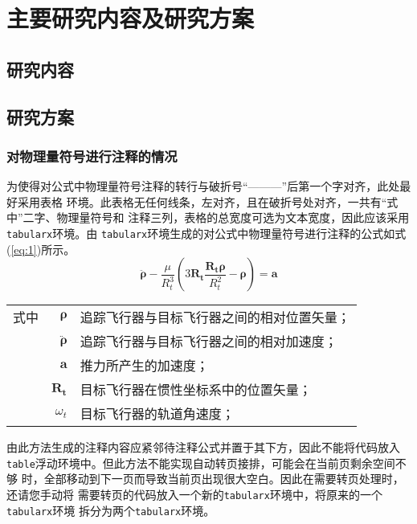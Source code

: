 
\chapter{主要研究内容及研究方案}

\section{研究内容}

\lipsum[1]

\section{研究方案}

\subsection{对物理量符号进行注释的情况}

为使得对公式中物理量符号注释的转行与破折号“———”后第一个字对齐，此处最好采用表格
环境。此表格无任何线条，左对齐，且在破折号处对齐，一共有“式中”二字、物理量符号和
注释三列，表格的总宽度可选为文本宽度，因此应该采用\verb|tabularx|环境。由
\verb|tabularx|环境生成的对公式中物理量符号进行注释的公式如式(\ref{eq:1})所示。
\begin{equation}\label{eq:1}
\ddot{\bm{\rho}}-\frac{\mu}{R_{t}^{3}}\left(3\bm{R_{t}}\frac{\bm{R_{t}\rho}}{R_{t}^{2}}-\bm{\rho}\right)=\bm{a}
\end{equation}
\begin{tabularx}{\textwidth}{@{}l@{\quad}r@{———}X@{}}
式中& $\bm{\rho}$ &追踪飞行器与目标飞行器之间的相对位置矢量；\\
&  $\bm{\ddot{\rho}}$&追踪飞行器与目标飞行器之间的相对加速度；\\
&  $\bm{a}$   &推力所产生的加速度；\\
&  $\bm{R_t}$ & 目标飞行器在惯性坐标系中的位置矢量；\\
&  $\omega_{t}$ & 目标飞行器的轨道角速度；\\
\end{tabularx}\vspace{3.15bp}
由此方法生成的注释内容应紧邻待注释公式并置于其下方，因此不能将代码放入
\verb|table|浮动环境中。但此方法不能实现自动转页接排，可能会在当前页剩余空间不够
时，全部移动到下一页而导致当前页出现很大空白。因此在需要转页处理时，还请您手动将
需要转页的代码放入一个新的\verb|tabularx|环境中，将原来的一个\verb|tabularx|环境
拆分为两个\verb|tabularx|环境。


